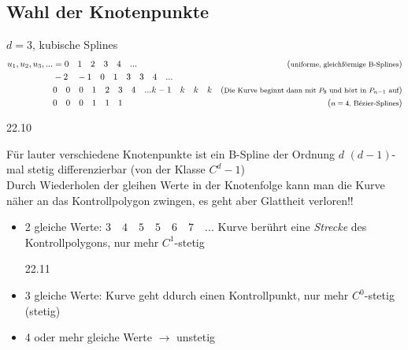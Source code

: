 \subsection{Wahl der Knotenpunkte}
$d = 3$, kubische Splines
\begin{align*}
 u_1, u_2, u_3, ... &= 0\quad1\quad2\quad3\quad4\quad... & (\text{\footnotesize uniforme, gleichförmige B-Splines})\\
		& -2\quad-1\quad0\quad1\quad3\quad3\quad4\quad...\\
		& 0\quad0\quad0\quad1\quad2\quad3\quad4\quad...k-1\quad k\quad k \quad k &
			(\text{\footnotesize Die Kurve beginnt dann mit $P_9$ und hört in $P_{n-1}$ auf})\\
		& 0\quad0\quad0\quad1\quad1\quad1 &(\text{\footnotesize $n=4$, Bézier-Splines})
\end{align*}
\begin{center}
 22.10
\end{center}
Für lauter verschiedene Knotenpunkte ist ein B-Spline der Ordnung $d$ $(d-1)$-mal stetig differenzierbar (von der
Klasse $C^d-1$)\\[1em]
Durch Wiederholen der gleihen Werte in der Knotenfolge kann man die Kurve näher an das Kontrollpolygon zwingen,
es geht aber Glattheit verloren!!
\begin{itemize}
 \item 2 gleiche Werte: $3 \quad 4 \quad 5 \quad 5 \quad 6 \quad 7 \quad ...$ Kurve berührt eine \emph{Strecke} des
	Kontrollpolygons, nur mehr $C^1$-stetig
	\begin{center}
	 22.11
	\end{center}
 \item 3 gleiche Werte: Kurve geht ddurch einen Kontrollpunkt, nur mehr $C^0$-stetig (stetig)
 \item 4 oder mehr gleiche Werte $\rightarrow$ unstetig
\end{itemize}